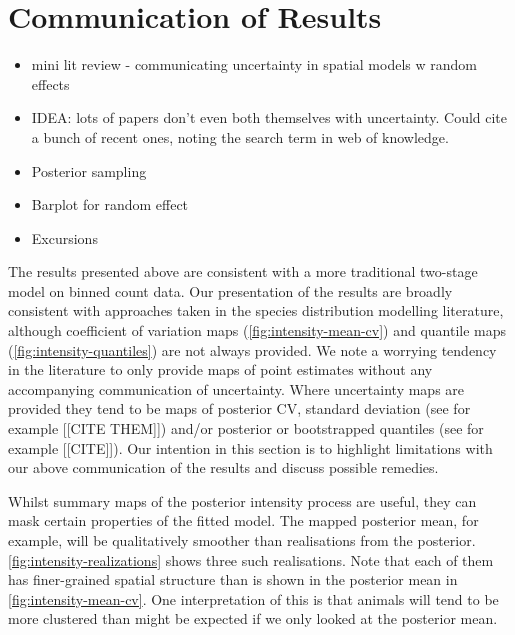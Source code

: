 \documentclass[preprint,12pt]{elsarticle}
\begin{document}
  

\clearpage %

\section{Communication of Results}


\begin{itemize}
	\item mini lit review - communicating uncertainty in spatial models w random effects
	\item IDEA:  lots of papers don't even both themselves with uncertainty.  Could cite a bunch of recent ones, noting the search term in web of knowledge.
\end{itemize}

\begin{itemize}
	\item Posterior sampling
	\item Barplot for random effect
	\item Excursions
\end{itemize}

The results presented above are consistent with a more traditional two-stage model on binned count data.  Our presentation of the results are broadly consistent with approaches taken in the species distribution modelling literature, although coefficient of variation maps (\autoref{fig:intensity-mean-cv}) and quantile maps (\autoref{fig:intensity-quantiles}) are not always provided.  We note a worrying tendency in the literature to only provide maps of point estimates without any accompanying communication of uncertainty.  Where uncertainty maps are provided they tend to be maps of posterior CV, standard deviation (see for example [[CITE THEM]]) and/or posterior or bootstrapped quantiles (see for example [[CITE]]).  Our intention in this section is to highlight limitations with our above communication of the results and discuss possible remedies.

Whilst summary maps of the posterior intensity process are useful, they can mask certain properties of the fitted model. The mapped posterior mean, for example, will be qualitatively smoother than realisations from the posterior.\autoref{fig:intensity-realizations} shows three such realisations.  Note that each of them has finer-grained spatial structure than is shown in the posterior mean in \autoref{fig:intensity-mean-cv}.  One interpretation of this is that animals will tend to be more clustered than might be expected if we only looked at the posterior mean.
\end{document}
